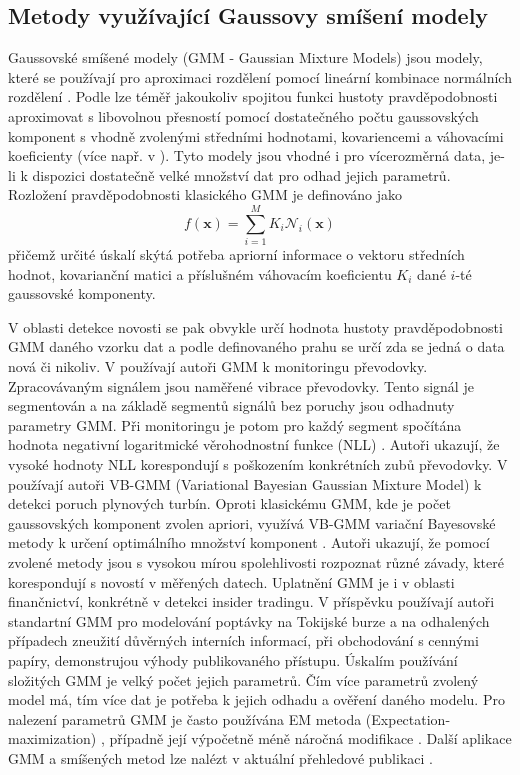 \subsection{Metody využívající Gaussovy smíšení modely}
Gaussovské smíšené modely (GMM - Gaussian Mixture Models) jsou modely, které se používají pro aproximaci rozdělení pomocí lineární kombinace normálních  rozdělení \cite{gmm1}. Podle \cite{gmm2} lze téměř jakoukoliv spojitou funkci hustoty pravděpodobnosti aproximovat s libovolnou přesností pomocí dostatečného počtu gaussovských komponent s vhodně zvolenými středními hodnotami, kovariencemi a váhovacími koeficienty (více např. v \cite{gmm3,gmm4}). Tyto modely jsou vhodné i pro vícerozměrná data, je-li k dispozici dostatečně velké množství dat pro odhad jejich parametrů. Rozložení pravděpodobnosti klasického GMM je definováno jako
\begin{equation}
f(\textbf{x})=\sum_{i=1}^M K_i\mathcal{N}_i(\textbf{x})
\end{equation}
přičemž určité úskalí skýtá potřeba apriorní informace o vektoru středních hodnot, kovarianční matici a příslušném váhovacím koeficientu $K_i$ dané $i$-té gaussovské komponenty. 
\par V oblasti detekce novosti se pak obvykle určí hodnota hustoty pravděpodobnosti GMM daného vzorku dat a podle definovaného prahu se určí zda se jedná o data nová či nikoliv.  V \cite{gmm2} používají autoři GMM k monitoringu převodovky. Zpracovávaným signálem jsou naměřené vibrace převodovky. Tento signál je segmentován a na základě segmentů signálů bez poruchy jsou odhadnuty parametry GMM. Při monitoringu je potom pro každý segment spočítána hodnota negativní logaritmické věrohodnostní funkce (NLL) \cite{gmm5}. Autoři ukazují, že vysoké hodnoty NLL korespondují s poškozením konkrétních zubů převodovky. V \cite{gmm6} používají autoři VB-GMM (Variational Bayesian Gaussian Mixture Model) k detekci poruch plynových turbín. Oproti klasickému GMM, kde je počet gaussovských komponent zvolen apriori, využívá VB-GMM variační Bayesovské metody k určení optimálního množství komponent \cite{gmm7}. Autoři ukazují, že pomocí zvolené metody jsou s vysokou mírou spolehlivosti rozpoznat různé závady, které korespondují s novostí v měřených datech. Uplatnění GMM je i v oblasti finančnictví, konkrétně v detekci insider tradingu. V příspěvku \cite{gmm8} používají autoři standartní GMM pro modelování poptávky na Tokijské burze a na odhalených případech zneužití důvěrných interních informací, při obchodování s cennými papíry, demonstrujou výhody publikovaného přístupu. Úskalím používání složitých GMM je velký počet jejich parametrů. Čím více parametrů zvolený model má, tím více dat je potřeba k jejich odhadu a ověření daného modelu. Pro nalezení parametrů GMM je často používána EM metoda (Expectation-maximization) \cite{gmm9}, případně její výpočetně méně náročná modifikace \cite{gmm10}. Další aplikace GMM a smíšených metod lze nalézt v aktuální přehledové publikaci \cite{gmm11}.

